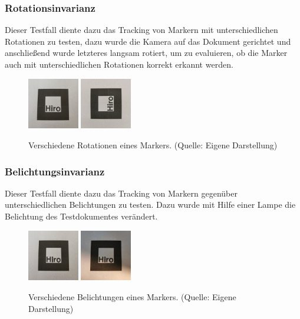 \subsubsection{Rotationsinvarianz} Dieser Testfall diente dazu das Tracking von Markern mit unterschiedlichen Rotationen zu testen, dazu wurde die Kamera auf das Dokument gerichtet und anschließend wurde letzteres langsam rotiert, um zu evaluieren, ob die Marker auch mit unterschiedlichen Rotationen korrekt erkannt werden.
\begin{figure}[H]
    \centering
    \includegraphics[width=0.2\textwidth]{Abbildungen/Invarianz/Rotation1.jpg}
    \includegraphics[width=0.2\textwidth]{Abbildungen/Invarianz/Rotation2.jpg}
    \caption[Rotationen eines Markers]{Verschiedene Rotationen eines Markers. (Quelle: Eigene Darstellung)}
\end{figure}

\subsubsection{Belichtungsinvarianz} Dieser Testfall diente dazu das Tracking von Markern gegenüber unterschiedlichen Belichtungen zu testen. Dazu wurde mit Hilfe einer Lampe die Belichtung des Testdokumentes verändert.
\begin{figure}[H]
  	\centering
    \includegraphics[width=0.2\textwidth]{Abbildungen/Invarianz/Belichtung1.jpg}
    \includegraphics[width=0.2\textwidth]{Abbildungen/Invarianz/Belichtung2.jpg}
    \caption[Belichtungen eines Markers]{Verschiedene Belichtungen eines Markers. (Quelle: Eigene Darstellung)}
\end{figure}

